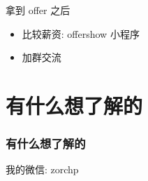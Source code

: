 \documentclass{ctexbeamer}
\begin{document}
\begin{frame}{拿到 offer 之后}
	\begin{itemize}
		\item 比较薪资: offershow 小程序
		\item 加群交流
	\end{itemize}
\end{frame}

\section{有什么想了解的}

\begin{frame}
	\frametitle{有什么想了解的}

	我的微信: zorchp
\end{frame}

\begin{frame}{}
	\begin{center}
	\end{center}
\end{frame}
\end{document}
